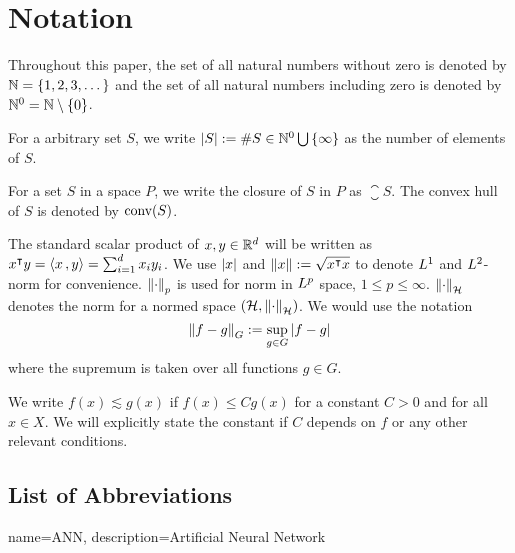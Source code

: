 \chapter*{Notation}
\label{c:Notation}


Throughout this paper, the set of all natural numbers without zero is denoted by
$\mathbb{N} = \{1,2,3,\dots\}$ and the set of all natural numbers including zero is
denoted by $\mathbb{N}^0 = \mathbb{N} \setminus \{0\}$. 

For a arbitrary set $S$, we write $\left| S \right| := \# S \in \mathbb{N}^0 \bigcup\,
\{\infty\}$ as the number of elements of $S$.

For a set $S$ in a space $P$, we write the closure of $S$ in $P$ as
$\closure{S}$. The convex hull of $S$ is denoted by $\textrm{conv}(S)$.

The standard scalar product of $x,y\in\mathbb{R}^d$ will be written as $x{}^{\intercal} y =
\left\langle x\, , y \right\rangle = \sum_{i=1}^d x_iy_i$. We use $\left| x \right|$ and $\left\| x \right\| := \sqrt{x{}^{\intercal}
x}$ to denote $L^{1}$ and $L^{2}$-norm for convenience. $\left\| \cdot \right\|_{p}$ is
used for norm in $L^{p}$ space, $1 \leq p \leq \infty$.
$\left\| \cdot \right\|_{\mathcal{H}}$ denotes the norm for a normed space $(\mathcal{H},
\left\| \cdot \right\|_{\mathcal{H}})$. We would use the notation
\begin{equation}
    \left\| f - g \right\|_{G} := \sup_{g\in G} \left| f - g \right|
\end{equation}
where the supremum is taken over all functions $g \in G$.

We write $f(x) \lesssim g(x)$ if $f(x) \leq C g(x)$ for a constant $C>0$ and for
all $x \in X$. We will explicitly state the constant if $C$ depends on $f$ or
any other relevant conditions.

\section*{List of Abbreviations}

\printglossary

{
    name=ANN,
    description={Artificial Neural Network}
}





